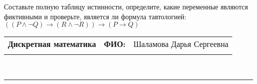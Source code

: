 \documentclass[10pt]{exam}
\newcommand{\class}{Дискретная математика}
\newcommand{\examdate}{}
\begin{document}
\begin{questions}
\begin{enumerate}[a)]
\end{enumerate}\question Составьте полную таблицу истинности, определите, какие переменные являются фиктивными и проверьте, является ли формула тавтологией:
$(( P \land \neg Q) \rightarrow (R \land \neg R)) \rightarrow (P \rightarrow Q)$

\end{questions}
\newpage
\begin{flushright}
\begin{tabular}{p{2.8in} r l}
\textbf{\class} & \textbf{ФИО:} &Шаламова Дарья Сергеевна
\\

\textbf{\examdate} &&\\
\end{tabular}\\
\end{flushright}
\rule[1ex]{\textwidth}{.1pt}
\end{document}
